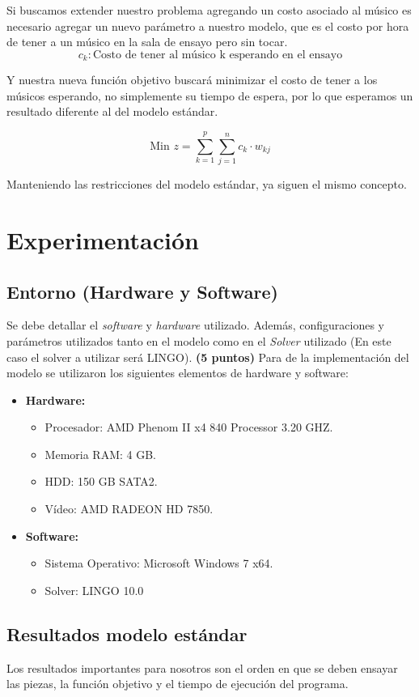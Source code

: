 \documentclass[journal, 10pt]{IEEEtran}
\begin{document}
Si buscamos extender nuestro problema agregando un costo asociado al músico es necesario agregar un nuevo parámetro a nuestro modelo, que es el costo por hora de tener a un músico en la sala de ensayo pero sin tocar.
	$$c_k : \text{Costo de tener al músico k esperando en el ensayo} $$
	
Y nuestra nueva función objetivo buscará minimizar el costo de tener a los músicos esperando, no simplemente su tiempo de espera, por lo que esperamos un resultado diferente al del modelo estándar.

\begin{equation} \label{eq:FO2}
\text{Min } z = \sum_{k=1}^{p}\sum_{j=1}^n c_{k} \cdot w_{kj} 
\end{equation}

Manteniendo las restricciones del modelo estándar, ya siguen el mismo concepto.

\section{Experimentación}
\subsection{Entorno (Hardware y Software)}
Se debe detallar el \textit{software} y \textit{hardware} utilizado. Además, configuraciones y parámetros utilizados tanto en el modelo como en el \textit{Solver} utilizado (En este caso el solver a utilizar será LINGO). \textbf{(5 puntos)}
Para de la implementación del modelo se utilizaron los siguientes elementos de hardware y software:
\begin{itemize}
	\item \textbf{Hardware:} 
		\begin{itemize}
			\item Procesador: AMD Phenom II x4 840 Processor 3.20 GHZ.
			\item Memoria RAM: 4 GB.
			\item HDD: 150 GB SATA2.	
			\item Vídeo: AMD RADEON HD 7850.
		\end{itemize}
	\item \textbf{Software:}
		\begin{itemize}
			\item Sistema Operativo: Microsoft Windows 7 x64.
			\item Solver: LINGO 10.0
		\end{itemize}
\end{itemize}
\subsection{Resultados modelo estándar} 
Los resultados importantes para nosotros son el orden en que se deben ensayar las piezas, la función objetivo y el tiempo de ejecución del programa.
\end{document}
